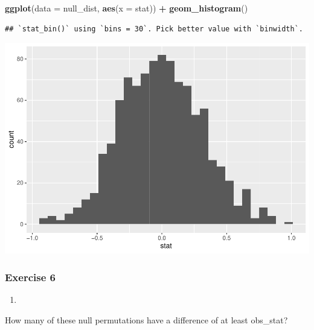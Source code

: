 \documentclass[
]{article}
\newenvironment{Shaded}{\begin{snugshade}}{\end{snugshade}}
\newcommand{\ControlFlowTok}[1]{\textcolor[rgb]{0.13,0.29,0.53}{\textbf{#1}}}
\newcommand{\DataTypeTok}[1]{\textcolor[rgb]{0.13,0.29,0.53}{#1}}
\newcommand{\DecValTok}[1]{\textcolor[rgb]{0.00,0.00,0.81}{#1}}
\newcommand{\KeywordTok}[1]{\textcolor[rgb]{0.13,0.29,0.53}{\textbf{#1}}}
\newcommand{\NormalTok}[1]{#1}
\newcommand{\OperatorTok}[1]{\textcolor[rgb]{0.81,0.36,0.00}{\textbf{#1}}}
\newcommand{\OtherTok}[1]{\textcolor[rgb]{0.56,0.35,0.01}{#1}}
\newcommand{\StringTok}[1]{\textcolor[rgb]{0.31,0.60,0.02}{#1}}
\begin{document}
\begin{Shaded}
\begin{Highlighting}[]
\KeywordTok{ggplot}\NormalTok{(}\DataTypeTok{data =}\NormalTok{ null_dist, }\KeywordTok{aes}\NormalTok{(}\DataTypeTok{x =}\NormalTok{ stat)) }\OperatorTok{+}
\StringTok{  }\KeywordTok{geom_histogram}\NormalTok{()}
\end{Highlighting}
\end{Shaded}

\begin{verbatim}
## `stat_bin()` using `bins = 30`. Pick better value with `binwidth`.
\end{verbatim}

\includegraphics{lab_7_files/figure-latex/unnamed-chunk-9-1.pdf}

\hypertarget{exercise-6}{%
\subsubsection{Exercise 6}\label{exercise-6}}

\begin{enumerate}
\def\labelenumi{\arabic{enumi}.}
\item
\end{enumerate}

How many of these null permutations have a difference of at least
obs\_stat?

\begin{Shaded}
\end{Shaded}
\end{document}
